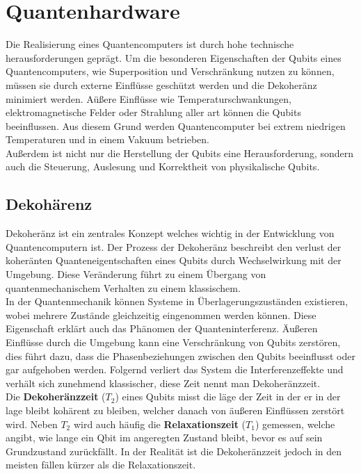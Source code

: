 \section{Quantenhardware}
\label{sec:quantenhardware}

Die Realisierung eines Quantencomputers ist durch hohe technische herausforderungen geprägt. Um die besonderen Eigenschaften der Qubits eines Quantencomputers, wie Superposition und Verschränkung nutzen zu können, müssen sie durch externe Einflüsse geschützt werden und die Dekoheränz minimiert werden.
Aüßere Einflüsse wie Temperaturschwankungen, elektromagnetische Felder oder Strahlung aller art können die Qubits beeinflussen. Aus diesem Grund werden Quantencomputer bei extrem niedrigen Temperaturen und in einem Vakuum betrieben.\\

Außerdem ist nicht nur die Herstellung der Qubits eine Herausforderung, sondern auch die Steuerung, Auslesung und Korrektheit von physikalische Qubits.

\subsection{Dekohärenz}
\label{sub:dekohaerenz}
Dekoheränz ist ein zentrales Konzept welches wichtig in der Entwicklung von Quantencomputern ist. Der Prozess der Dekoheränz beschreibt den verlust der koheränten Quanteneigentschaften eines Qubits durch Wechselwirkung mit der Umgebung.
Diese Veränderung führt zu einem Übergang von quantenmechanischem Verhalten zu einem klassischem.\\

In der Quantenmechanik können Systeme in Überlagerungszuständen existieren, wobei mehrere Zustände gleichzeitig eingenommen werden können. Diese Eigenschaft erklärt auch das Phänomen der Quanteninterferenz.
Äußeren Einflüsse durch die Umgebung kann eine Verschränkung von Qubits zerstören, dies führt dazu, dass die Phasenbeziehungen zwischen den Qubits beeinflusst oder gar aufgehoben werden.
Folgernd verliert das System die Interferenzeffekte und verhält sich zunehmend klassischer, diese Zeit nennt man Dekoheränzzeit.\\

Die \textbf{Dekoheränzzeit} ($T_2$) eines Qubits misst die läge der Zeit in der er in der lage bleibt kohärent zu bleiben, welcher danach von äußeren Einflüssen zerstört wird.
Neben $T_2$ wird auch häufig die \textbf{Relaxationszeit} ($T_1$) gemessen, welche angibt, wie lange ein Qbit im angeregten Zustand bleibt, bevor es auf sein Grundzustand zurückfällt.
In der Realität ist die Dekoheränzzeit jedoch in den meisten fällen kürzer als die Relaxationszeit.\\

